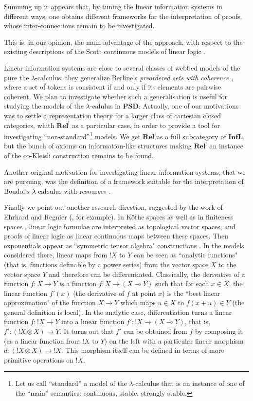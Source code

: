 \documentclass[copyright,creativecommons]{eptcs}
\newcommand{\Psd}{\mathbf{PSD}} \newcommand{\Sd}{\mathbf{SD}} \newcommand{\Palglat}{\mathbf{PAL}} \newcommand{\Cpo}{\mathbf{Cpo}} \newcommand{\Inf}{\mathbf{Inf}} \newcommand{\Inflfull}{\mathbf{InfLFull}} \newcommand{\Scottl}{\mathbf{ScottL}} \newcommand{\Rel}{\mathbf{Rel}} \newcommand{\Infl}{\mathbf{InfL}} \newcommand{\Cl}{Cl}
\begin{document}
Summing up it appears that, by  tuning the linear information systems in different ways, one  obtains different frameworks for the interpretation of proofs, whose inter-connections remain to be investigated.

This is, in our opinion, the main advantage of the approach, with respect to the existing descriptions of the Scott continuous models of linear logic \cite{Barr79, Huth94, Huth94b, Winskel99}. 

Linear information systems are close to several classes of webbed models of the pure the $\lambda$-calculus: they generalize Berline's {\em preordered sets with coherence} \cite{Berline00}, where a set of tokens is consistent if and only if its elements are pairwise coherent. We plan to investigate whether such a generalisation is useful for studying the models of the $\lambda$-calulus in  $\Psd$. Actually, one of our motivations was to settle a representation theory for a larger class of cartesian closed categories, whith $\Rel^!$ as a particular case, in order to provide a tool for investigating ``non-standard''\footnote{Let us call ``standard'' a  model of the $\lambda$-calculus that is an instance of one of the ``main'' semantics: continuous, stable, strongly stable.} models. We get $\Rel$ as a full subcategory of $\Infl$, but the bunch of axioms on information-like structures making $\Rel^!$ an instance of the co-Kleisli construction remains to be found.

Another original motivation for investigating linear information systems, that we are pursuing, was the definition of a framework suitable for the interpretation of Boudol's $\lambda$-calculus with resources \cite{Boudol93}.

Finally we point out another research direction, suggested by the work of Ehrhard and Regnier (\cite{Ehrhard06}, for example). In K\"{o}the spaces \cite{Ehrhard02} as well as in finiteness spaces \cite{Ehrhard05}, linear logic formulae are interpreted as topological vector spaces, and proofs of linear logic as linear continuous maps between these spaces. Then exponentials appear as ``symmetric tensor algebra" constructions \cite{Blute93}. In the models considered there, linear maps from $!X$ to $Y$ can be seen as ``analytic functions" (that is, functions definable by a power series) from the vector space $X$ to the vector space $Y$ and therefore can be differentiated.  Classically, the derivative of a function $f: X \to Y$ is a function $f: X \to (X \multimap Y)$ such that for each $x \in X$, the linear function $f'(x)$ (the derivative of $f$ at point $x$) is the ``best linear approximation" of the function $X \to Y$ which maps $u \in X$ to $f(x + u) \in Y$ (the general definition is local). In the analytic case, differentiation turns a linear function $f: !X \to Y$ into a linear function $f': !X \to (X \multimap Y)$, that is, $f': (!X \otimes X) \to Y$. It turns out that $f'$ can be obtained from $f$ by composing it (as a linear function from $!X$ to $Y$) on the left with a particular linear morphism $d: (!X \otimes X) \to !X$. This morphism itself can be defined in terms of more primitive operations on $!X$. 
\end{document}
